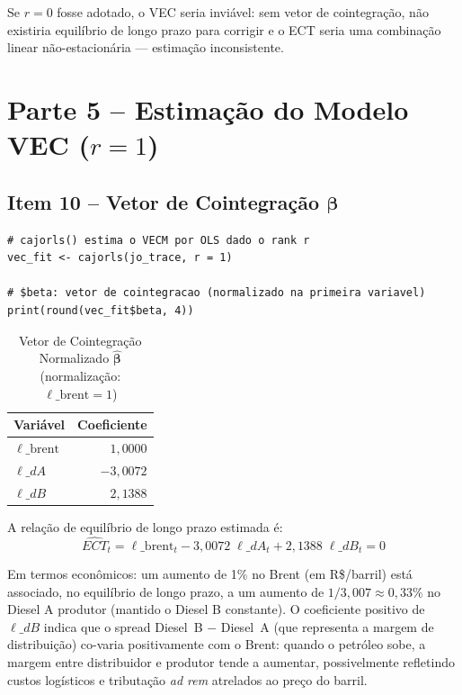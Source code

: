 \documentclass[12pt,a4paper]{article}
\begin{document}
\noindent
Se $r = 0$ fosse adotado, o VEC seria inviável: sem vetor de cointegração,
não existiria equilíbrio de longo prazo para corrigir e o ECT seria
uma combinação linear não-estacionária --- estimação inconsistente.

\section{Parte 5 -- Estimação do Modelo VEC ($r = 1$)}

\subsection{Item 10 -- Vetor de Cointegração $\boldsymbol{\beta}$}

\begin{lstlisting}[caption={Estimação do VECM com cajorls() e extração de beta}]
# cajorls() estima o VECM por OLS dado o rank r
vec_fit <- cajorls(jo_trace, r = 1)

# $beta: vetor de cointegracao (normalizado na primeira variavel)
print(round(vec_fit$beta, 4))
\end{lstlisting}

\begin{table}[H]
\centering
\caption{Vetor de Cointegração Normalizado $\hat{\boldsymbol{\beta}}$ (normalização: $\ell\_\text{brent} = 1$)}
\label{tab:beta}
\begin{tabular}{lr}
\toprule
Variável & Coeficiente \\
\midrule
$\ell\_\text{brent}$ & $1{,}0000$ \\
$\ell\_dA$           & $-3{,}0072$ \\
$\ell\_dB$           & $\phantom{-}2{,}1388$ \\
\bottomrule
\end{tabular}
\end{table}

\noindent
A relação de equilíbrio de longo prazo estimada é:
\begin{equation}
  \widehat{ECT}_t = \ell\_\text{brent}_{t} - 3{,}0072\;\ell\_dA_{t} + 2{,}1388\;\ell\_dB_{t} = 0
  \label{eq:ect}
\end{equation}

\noindent
Em termos econômicos: um aumento de 1\% no Brent (em R\$/barril) está
associado, no equilíbrio de longo prazo, a um aumento de
$1/3{,}007 \approx 0{,}33\%$ no Diesel A produtor (mantido o Diesel B constante).
O coeficiente positivo de $\ell\_dB$ indica que o spread Diesel~B $-$ Diesel~A
(que representa a margem de distribuição) co-varia positivamente com o Brent:
quando o petróleo sobe, a margem entre distribuidor e produtor tende a
aumentar, possivelmente refletindo custos logísticos e tributação \emph{ad rem}
atrelados ao preço do barril.
\end{document}
